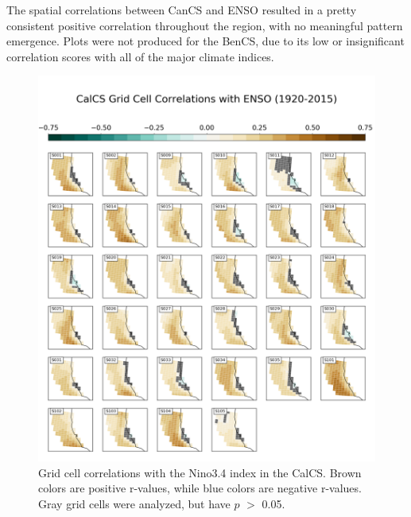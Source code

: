 \documentclass[12pt]{article}
\begin{document}
The spatial correlations between CanCS and ENSO resulted in a pretty consistent positive correlation throughout the region, with no meaningful pattern emergence. Plots were not produced for the BenCS, due to its low or insignificant correlation scores with all of the major climate indices.

\newpage
\begin{figure}[!h]
	\centering
	\includegraphics[width=\linewidth]{../../figs/calcs/spatial-correlations/calcs-grid-cell-correlations-nino34-postage.png}
	\caption{Grid cell correlations with the Nino3.4 index in the CalCS. Brown colors are positive r-values, while blue colors are negative r-values. Gray grid cells were analyzed, but have $p$ $>$ 0.05.}
	\label{fig:CalCS-ENSO-Spatial}
\end{figure}
\newpage
\end{document}
